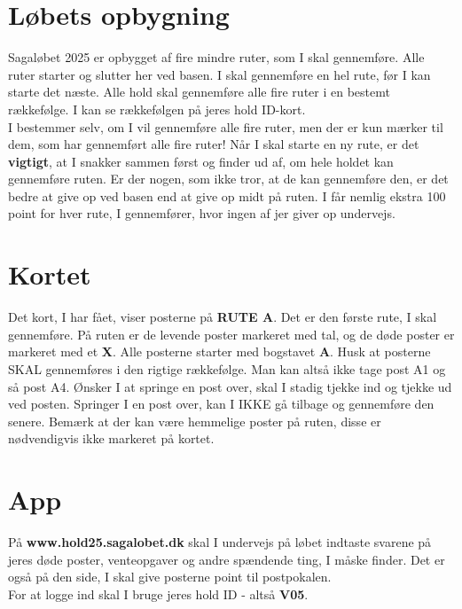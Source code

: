 \section{Løbets opbygning}
Sagaløbet 2025 er opbygget af fire mindre ruter, som I skal gennemføre. Alle ruter starter og slutter her ved basen. I skal gennemføre en hel rute, før I kan starte det næste. Alle hold skal gennemføre alle fire ruter i en bestemt rækkefølge. I kan se rækkefølgen på jeres hold ID-kort.\\\newline
I bestemmer selv, om I vil gennemføre alle fire ruter, men der er kun mærker til dem, som har gennemført alle fire ruter! Når I skal starte en ny rute, er det \textbf{vigtigt}, at I snakker sammen først og finder ud af, om hele holdet kan gennemføre ruten. Er der nogen, som ikke tror, at de kan gennemføre den, er det bedre at give op ved basen end at give op midt på ruten. I får nemlig ekstra 100 point for hver rute, I gennemfører, hvor ingen af jer giver op undervejs.\\
\section{Kortet}
Det kort, I har fået, viser posterne på \textbf{RUTE A}. Det er den første rute, I skal gennemføre. På ruten er de levende poster markeret med tal, og de døde poster er markeret med et \textbf{X}. Alle posterne starter med bogstavet \textbf{A}. Husk at posterne SKAL gennemføres i den rigtige rækkefølge. Man kan altså ikke tage post A1 og så post A4. Ønsker I at springe en post over, skal I stadig tjekke ind og tjekke ud ved posten. Springer I en post over, kan I IKKE gå tilbage og gennemføre den senere. Bemærk at der kan være hemmelige poster på ruten, disse er nødvendigvis ikke markeret på kortet.
\section{App}
På \textbf{www.hold25.sagalobet.dk} skal I undervejs på løbet indtaste svarene på jeres døde poster, venteopgaver og andre spændende ting, I måske finder. Det er også på den side, I skal give posterne point til postpokalen.\\
For at logge ind skal I bruge jeres hold ID - altså \textbf{V05}.
\newpage

